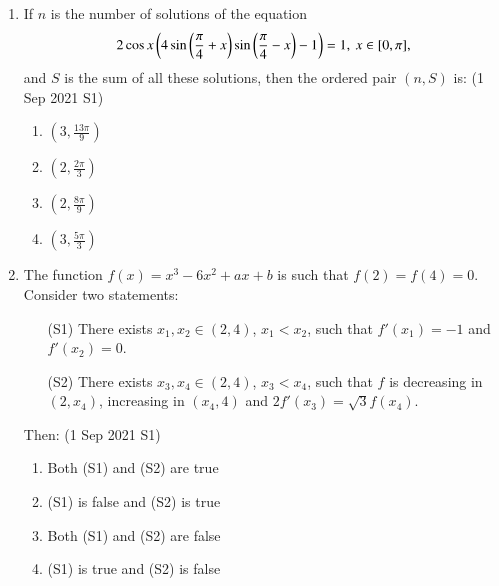 \documentclass[journal]{IEEEtran}
\begin{document}
\begin{enumerate}
    \item If $n$ is the number of solutions of the equation
    $$
    2\cos x\left(4\sin\left(\frac{\pi}{4} + x\right) \sin\left(\frac{\pi}{4} - x\right) -1 \right) = 1, \: x \in [0, \pi],
    $$
    and $S$ is the sum of all these solutions, then the ordered pair $(n, S)$ is: \hfill (1 Sep 2021 S1)
    \begin{multicols}{4}
        \begin{enumerate}
            \item $(3, \frac{13\pi}{9})$
            \item $(2, \frac{2\pi}{3})$
            \item $(2, \frac{8\pi}{9})$
            \item $(3, \frac{5\pi}{3})$
        \end{enumerate}
    \end{multicols}

    \item The function $f(x) = x^3 - 6x^2 + ax + b$ is such that $f(2) = f(4) = 0$. Consider two statements:
    \begin{itemize}
        \item[(S1)] There exists $x_1, x_2 \in (2, 4)$, $x_1 < x_2$, such that $f'(x_1) = -1$ and $f'(x_2) = 0$.
        \item[(S2)] There exists $x_3, x_4 \in (2, 4)$, $x_3 < x_4$, such that $f$ is decreasing in $(2, x_4)$, increasing in $(x_4, 4)$ and $2f'(x_3) = \sqrt{3}f(x_4)$.
    \end{itemize}
    Then:  \hfill (1 Sep 2021 S1)
    \begin{multicols}{2}
        \begin{enumerate}
            \item Both (S1) and (S2) are true
            \item (S1) is false and (S2) is true
            \item Both (S1) and (S2) are false
            \item (S1) is true and (S2) is false
        \end{enumerate}
    \end{multicols}


\end{enumerate}
\end{document}
